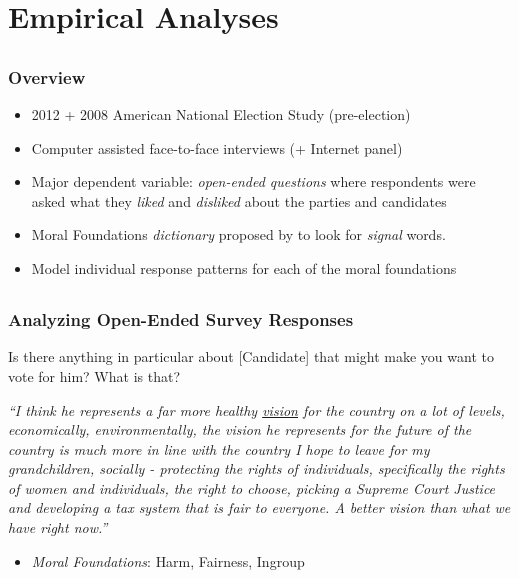 \documentclass{beamer}
\begin{document}
\section{Empirical Analyses}
\subsection{}
\begin{frame}%
  \frametitle{Overview}
  \begin{itemize}
    \item 2012 + 2008 American National Election Study (pre-election)
    \item Computer assisted face-to-face interviews (+ Internet panel)
    \item Major dependent variable: \emph{open-ended questions} where respondents were asked what they \emph{liked} and \emph{disliked} about the parties and candidates
    \item Moral Foundations \emph{dictionary} proposed by \citep{graham2009liberals} to look for \emph{signal} words.
    \item Model individual response patterns for each of the moral foundations
  \end{itemize}
\end{frame}

\subsection{}
\begin{frame}%
  \frametitle{Analyzing Open-Ended Survey Responses}
\begin{exampleblock}{Is there anything in particular about [Candidate] that might make you want to vote for him? What is that?}
  \begin{center}
    \textit{``I think he represents a far more healthy \underline{vision} for the country on a lot of levels, economically, environmentally, the vision he represents for the future of the country is much more in line with the country I hope to leave for my grandchildren, socially - {\color{blue}protecting} the {\color{green}rights} of {\color{red}individuals}, specifically the {\color{green}rights} of women and {\color{red}individuals}, the right to choose, picking a Supreme Court {\color{green}Justice} and developing a tax system that is {\color{green}fair} to everyone. A better vision than what we have right now.''}
  \end{center}
\end{exampleblock}
  \begin{itemize}
  \item \emph{\textit{Moral Foundations}}: {\color{blue}Harm}, {\color{green}Fairness}, {\color{red}Ingroup}
  \end{itemize}
\end{frame}
\end{document}

